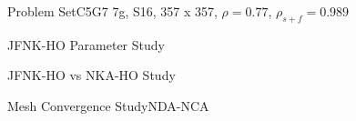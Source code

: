 \documentclass[sans,mathserif,aspectratio=169]{beamer}
\begin{document}
\begin{frame}{Problem Set}{C5G7 7g, S16, 357 x 357, $\rho = 0.77$, $\rho_{s+f} = 0.989$}
\centering
{}
\end{frame}

\begin{frame}{JFNK-HO Parameter Study}
\centering
{}
\end{frame}

\begin{frame}{JFNK-HO vs NKA-HO Study}
\centering
{}
\end{frame}

\begin{frame}{Mesh Convergence Study}{NDA-NCA}
\centering
{}
\end{frame}
\end{document}
